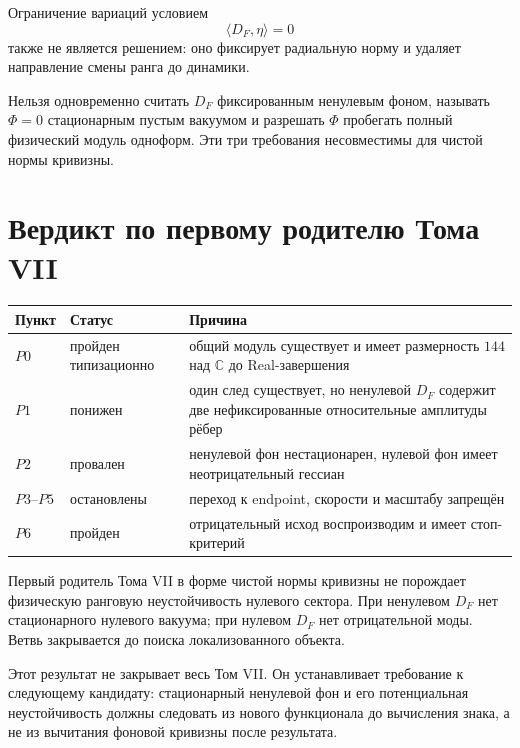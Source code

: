 Ограничение вариаций условием
\begin{equation}
 \langle D_F,\eta\rangle=0
\end{equation}
также не является решением: оно фиксирует радиальную норму и удаляет
направление смены ранга до динамики.

\begin{nogocriterion}
Нельзя одновременно считать $D_F$ фиксированным ненулевым фоном, называть
$\Phi=0$ стационарным пустым вакуумом и разрешать $\Phi$ пробегать полный
физический модуль одноформ. Эти три требования несовместимы для чистой нормы
кривизны.
\end{nogocriterion}

\section{Вердикт по первому родителю Тома VII}

\begin{center}
\begin{tabular}{p{}p{}p{}}
\toprule
Пункт & Статус & Причина \\
\midrule
$P0$ & пройден типизационно & общий модуль существует и имеет размерность
$144$ над $\mathbb C$ до Real-завершения \\
$P1$ & понижен & один след существует, но ненулевой $D_F$ содержит две
нефиксированные относительные амплитуды рёбер \\
$P2$ & провален & ненулевой фон нестационарен, нулевой фон имеет
неотрицательный гессиан \\
$P3$--$P5$ & остановлены & переход к endpoint, скорости и масштабу запрещён \\
$P6$ & пройден & отрицательный исход воспроизводим и имеет стоп-критерий \\
\bottomrule
\end{tabular}
\end{center}

\begin{theorem}
Первый родитель Тома VII в форме чистой нормы кривизны не порождает
физическую ранговую неустойчивость нулевого сектора. При ненулевом $D_F$
нет стационарного нулевого вакуума; при нулевом $D_F$ нет отрицательной
моды. Ветвь закрывается до поиска локализованного объекта.
\end{theorem}

Этот результат не закрывает весь Том VII. Он устанавливает требование к
следующему кандидату: стационарный ненулевой фон и его потенциальная
неустойчивость должны следовать из нового функционала до вычисления знака,
а не из вычитания фоновой кривизны после результата.

